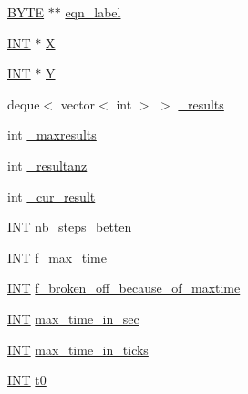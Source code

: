 \begin{DoxyCompactItemize}
\item 
\mbox{\hyperlink{galois_8h_ab6cc7b4aeb6ea31aba2b3fbfc83ff5e6}{B\+Y\+TE}} $\ast$$\ast$ \mbox{\hyperlink{classdiophant_af176ec03c964f87544ea6bcca4984090}{eqn\+\_\+label}}
\item 
\mbox{\hyperlink{galois_8h_a09fddde158a3a20bd2dcadb609de11dc}{I\+NT}} $\ast$ \mbox{\hyperlink{classdiophant_a5c712bff780bf353e9d8c64f734376c8}{X}}
\item 
\mbox{\hyperlink{galois_8h_a09fddde158a3a20bd2dcadb609de11dc}{I\+NT}} $\ast$ \mbox{\hyperlink{classdiophant_af1210d1ada55984684ad6400b1df9335}{Y}}
\item 
deque$<$ vector$<$ int $>$ $>$ \mbox{\hyperlink{classdiophant_a20136d8815e129214c58517bde04296f}{\+\_\+results}}
\item 
int \mbox{\hyperlink{classdiophant_aa33d42aca0ea09e8fe7985b9151ba8ea}{\+\_\+maxresults}}
\item 
int \mbox{\hyperlink{classdiophant_aa7f1ec1385dda10cf8efe89d02651339}{\+\_\+resultanz}}
\item 
int \mbox{\hyperlink{classdiophant_ae538cfb3290e4cc9674f2c6683913d5d}{\+\_\+cur\+\_\+result}}
\item 
\mbox{\hyperlink{galois_8h_a09fddde158a3a20bd2dcadb609de11dc}{I\+NT}} \mbox{\hyperlink{classdiophant_a0e73d16b106d7443285df7d5f1de0197}{nb\+\_\+steps\+\_\+betten}}
\item 
\mbox{\hyperlink{galois_8h_a09fddde158a3a20bd2dcadb609de11dc}{I\+NT}} \mbox{\hyperlink{classdiophant_a66b367b567e70c3c0fe2ed70d98e11b7}{f\+\_\+max\+\_\+time}}
\item 
\mbox{\hyperlink{galois_8h_a09fddde158a3a20bd2dcadb609de11dc}{I\+NT}} \mbox{\hyperlink{classdiophant_aeb33ea898dd3d37774b7f2861fc0e6f3}{f\+\_\+broken\+\_\+off\+\_\+because\+\_\+of\+\_\+maxtime}}
\item 
\mbox{\hyperlink{galois_8h_a09fddde158a3a20bd2dcadb609de11dc}{I\+NT}} \mbox{\hyperlink{classdiophant_a4185c62d608c6fae84abe63cedee13b2}{max\+\_\+time\+\_\+in\+\_\+sec}}
\item 
\mbox{\hyperlink{galois_8h_a09fddde158a3a20bd2dcadb609de11dc}{I\+NT}} \mbox{\hyperlink{classdiophant_a86c69d399265ce714eb1b2e6d53e5a04}{max\+\_\+time\+\_\+in\+\_\+ticks}}
\item 
\mbox{\hyperlink{galois_8h_a09fddde158a3a20bd2dcadb609de11dc}{I\+NT}} \mbox{\hyperlink{classdiophant_aff5ee754346a1b66cfe42895a48e88c6}{t0}}
\end{DoxyCompactItemize}
